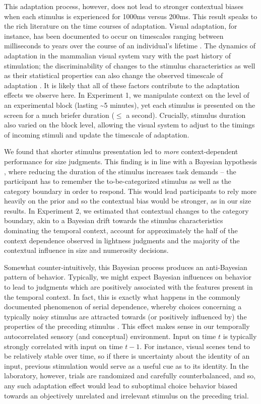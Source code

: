 \documentclass[a4paper, nobind]{templates/ociamthesis}
\begin{document}
This adaptation process, however, does not lead to stronger contextual biases when each stimulus is experienced for 1000ms versus 200ms. This result speaks to the rich literature on the time courses of adaptation. Visual adaptation, for instance, has been documented to occur on timescales ranging between milliseconds to years over the course of an individual's lifetime \autocite{webster2015}. The dynamics of adaptation in the mammalian visual system vary with the past history of stimulation; the discriminability of changes to the stimulus characteristics as well as their statistical properties can also change the observed timescale of adaptation \autocite[measured over the course of seconds and minutes,][]{wark2009}. It is likely that all of these factors contribute to the adaptation effects we observe here. In Experiment 1, we manipulate context on the level of an experimental block (lasting \textasciitilde5 minutes), yet each stimulus is presented on the screen for a much briefer duration (\(\leq\) a second). Crucially, stimulus duration also varied on the block level, allowing the visual system to adjust to the timings of incoming stimuli and update the timescale of adaptation.

We found that shorter stimulus presentation led to \emph{more} context-dependent performance for size judgments. This finding is in line with a Bayesian hypothesis \autocite{olkkonen2014}, where reducing the duration of the stimulus increases task demands -- the participant has to remember the to-be-categorized stimulus as well as the category boundary in order to respond. This would lead participants to rely more heavily on the prior and so the contextual bias would be stronger, as in our size results. In Experiment 2, we estimated that contextual changes to the category boundary, akin to a Bayesian drift towards the stimulus characteristics dominating the temporal context, account for approximately the half of the context dependence observed in lightness judgments and the majority of the contextual influence in size and numerosity decisions.

Somewhat counter-intuitively, this Bayesian process produces an anti-Bayesian pattern of behavior. Typically, we might expect Bayesian influences on behavior to lead to judgments which are positively associated with the features present in the temporal context. In fact, this is exactly what happens in the commonly documented phenomenon of serial dependence, whereby choices concerning a typically noisy stimulus are attracted towards (or positively influenced by) the properties of the preceding stimulus \autocite{fischer2014,kiyonaga2017}. This effect makes sense in our temporally autocorrelated sensory (and conceptual) environment. Input on time \(t\) is typically strongly correlated with input on time \(t-1\). For instance, visual scenes tend to be relatively stable over time, so if there is uncertainty about the identity of an input, previous stimulation would serve as a useful cue as to its identity. In the laboratory, however, trials are randomized and carefully counterbalanced, and so, any such adaptation effect would lead to suboptimal choice behavior biased towards an objectively unrelated and irrelevant stimulus on the preceding trial.
\end{document}
